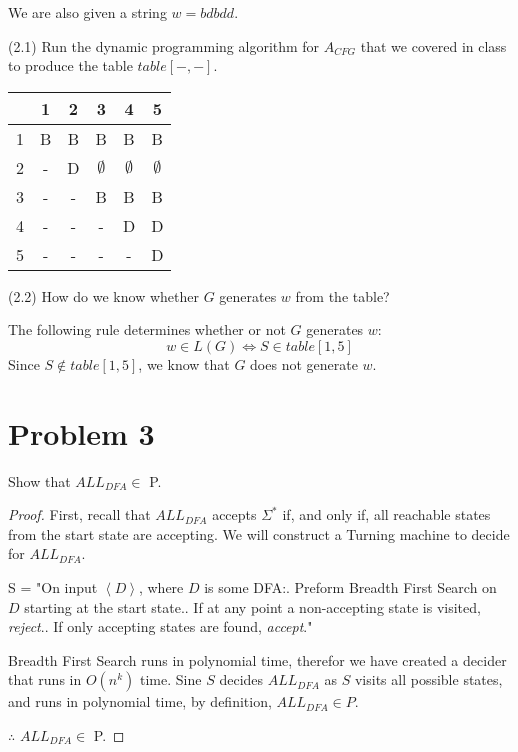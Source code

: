 \documentclass[11pt]{article}
\begin{document}
We are also given a string $w=bdbdd$.
\newline

\noindent
(2.1) Run the dynamic programming algorithm for $A_{CFG}$ that we covered in class to produce the table $table[-,-]$.
\newline

\begin{table}[H]
    \centering
    \begin{tabular}{c|c c c c c}
         & 1 & 2 & 3 & 4 & 5 \\
       \hline
       1 & B & B & B & B & B \\
       2 & - & D & $\emptyset$ & $\emptyset$ & $\emptyset$ \\
       3 & - & - & B & B & B \\
       4 & - & - & - & D & D \\
       5 & - & - & - & - & D
    \end{tabular}
\end{table}

\noindent
(2.2) How do we know whether $G$ generates $w$ from the table?
\newline

\noindent
The following rule determines whether or not $G$ generates $w$:
$$ w \in L(G) \Longleftrightarrow S \in table\left[ 1,5 \right]$$
Since $S \notin table \left[ 1,5 \right]$, we know that $G$ does not generate $w$.
\newpage


\section*{Problem 3}

Show that $ALL_{DFA}\in$ P.

\begin{proof}
First, recall that $ALL_{DFA}$ accepts $\Sigma^{*}$ if, and only if, all reachable states from the start state are accepting. We will construct a Turning machine to decide for $ALL_{DFA}$.

\noindent
S = "On input $\left< D \right>$, where $D$ is some DFA:. Preform Breadth First Search on $D$ starting at the start state.. If at any point a non-accepting state is visited, \textit{reject}.. If only accepting states are found, \textit{accept}."\newline

\noindent
Breadth First Search runs in polynomial time, therefor we have created a decider that runs in $O(n^{k})$ time. Sine $S$ decides $ALL_{DFA}$ as $S$ visits all possible states, and runs in polynomial time, by definition, $ALL_{DFA} \in P$.

\noindent
$\therefore$ $ALL_{DFA}\in$ P.
\end{proof}
\end{document}
